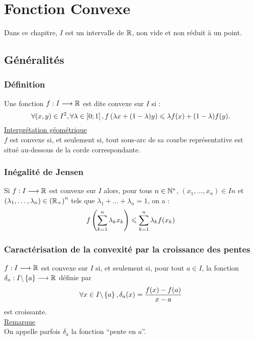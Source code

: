 \chapter{Fonction Convexe}

\minitoc

Dans ce chapitre, \(I\) est un intervalle de \(\mathbb{R}\), non vide et non réduit à un point.

\section{Généralités}
\subsection{Définition}
\begin{defi}
    Une fonction \(f : I \longrightarrow \mathbb{R}\) est dite convexe sur \(I\) si :
    \[\forall (x, y) \in I^2, \forall \lambda  \in \left[0;1\right] , f \left(\lambda x + (1 - \lambda )y\right) \leqslant \lambda f (x) + (1 - \lambda )f (y).\]
    \underline{Interprétation géométrique}\\
    \(f\) est convexe si, et seulement si, tout sous-arc de sa courbe représentative est situé au-dessous de la corde correspondante.
\end{defi}

\subsection{Inégalité de Jensen}
\begin{defprop}
    Si \(f : I \longrightarrow \mathbb{R}\) est convexe sur \(I\) alors, pour tous \(n \in \mathbb{N}^*\), \((x_1, \dots , x_n) \in In\) et \((\lambda_1, \dots , \lambda_n) \in \left(\mathbb{R}_+\right)^n\) tels que \(\lambda_1 + \dots + \lambda_n = 1\), on a :
    \[f\left(\sum^n_{k=1}\lambda_kx_k\right) \leqslant \sum^n_{k=1}\lambda_k f(x_k)\]
\end{defprop}

\subsection{Caractérisation de la convexité par la croissance des pentes}
\begin{defprop}
    \(f : I \longrightarrow \mathbb{R}\) est convexe sur \(I\) si, et seulement si, pour tout \(a \in I\), la fonction \(\delta_a : I \backslash \left\lbrace a\right\rbrace \longrightarrow \mathbb{R}\) définie par
    \[\forall x \in I \backslash \left\lbrace a\right\rbrace, \delta_a(x) = \frac{f (x) - f (a)}{x - a}\]
    est croissante.\\
    \underline{Remarque} \\
    On appelle parfois \(\delta_a\) la fonction “pente en \(a\)”.
\end{defprop}

